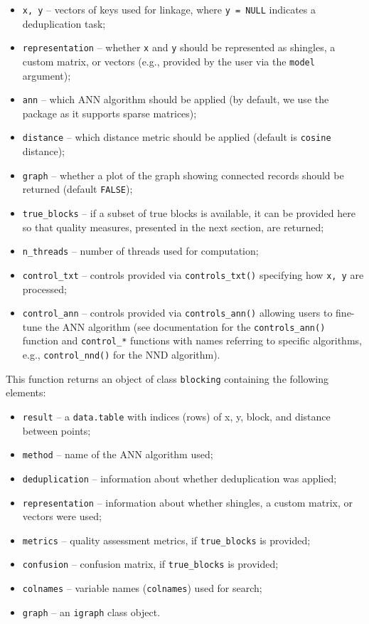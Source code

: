 \begin{itemize}
\tightlist
\item
  \texttt{x,\ y} -- vectors of keys used for linkage, where \texttt{y\ =\ NULL}
  indicates a deduplication task;
\item
  \texttt{representation} -- whether \texttt{x} and \texttt{y} should be represented as
  shingles, a custom matrix, or vectors (e.g., provided by the user
  via the \texttt{model} argument);
\item
  \texttt{ann} -- which ANN algorithm should be applied (by default, we use
  the  package as it supports sparse matrices);
\item
  \texttt{distance} -- which distance metric should be applied (default is
  \texttt{cosine} distance);
\item
  \texttt{graph} -- whether a plot of the graph showing connected records
  should be returned (default \texttt{FALSE});
\item
  \texttt{true\_blocks} -- if a subset of true blocks is available, it can be
  provided here so that quality measures, presented in the next
  section, are returned;
\item
  \texttt{n\_threads} -- number of threads used for computation;
\item
  \texttt{control\_txt} -- controls provided via \texttt{controls\_txt()} specifying
  how \texttt{x,\ y} are processed;
\item
  \texttt{control\_ann} -- controls provided via \texttt{controls\_ann()} allowing
  users to fine-tune the ANN algorithm (see documentation for the
  \texttt{controls\_ann()} function and \texttt{control\_*} functions with names
  referring to specific algorithms, e.g., \texttt{control\_nnd()} for the NND
  algorithm).
\end{itemize}

This function returns an object of class \texttt{blocking} containing the
following elements:

\begin{itemize}
\tightlist
\item
  \texttt{result} -- a \texttt{data.table} with indices (rows) of x, y, block, and
  distance between points;
\item
  \texttt{method} -- name of the ANN algorithm used;
\item
  \texttt{deduplication} -- information about whether deduplication was
  applied;
\item
  \texttt{representation} -- information about whether shingles, a custom
  matrix, or vectors were used;
\item
  \texttt{metrics} -- quality assessment metrics, if \texttt{true\_blocks} is
  provided;
\item
  \texttt{confusion} -- confusion matrix, if \texttt{true\_blocks} is provided;
\item
  \texttt{colnames} -- variable names (\texttt{colnames}) used for search;
\item
  \texttt{graph} -- an \texttt{igraph} class object.
\end{itemize}

